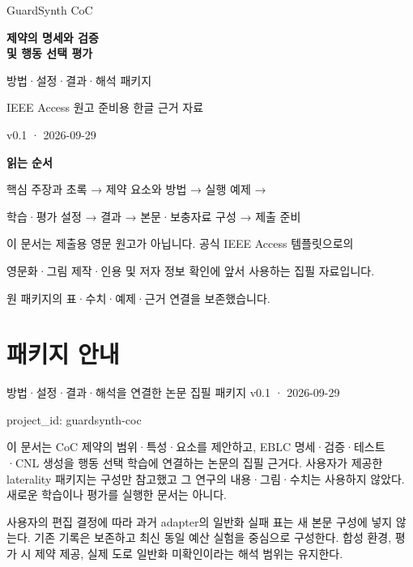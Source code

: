 \documentclass[11pt,a4paper]{article}
\begin{document}
\begin{titlepage}
\vspace*{20mm}
{\color{navy}\Large GuardSynth CoC\par}
\vspace{10mm}
{\huge\bfseries 제약의 명세와 검증\\[4mm]및 행동 선택 평가\par}
\vspace{12mm}
{\Large 방법·설정·결과·해석 패키지\par}
\vspace{6mm}
IEEE Access 원고 준비용 한글 근거 자료\par
v0.1 · 2026-09-29\par
\vspace{12mm}
\textbf{읽는 순서}\par
핵심 주장과 초록 → 제약 요소와 방법 → 실행 예제 →\par
학습·평가 설정 → 결과 → 본문·보충자료 구성 → 제출 준비\par
\vfill
이 문서는 제출용 영문 원고가 아닙니다. 공식 IEEE Access 템플릿으로의\par
영문화·그림 제작·인용 및 저자 정보 확인에 앞서 사용하는 집필 자료입니다.\par
원 패키지의 표·수치·예제·근거 연결을 보존했습니다.\par
\end{titlepage}
\tableofcontents
\clearpage
\section*{패키지 안내}


방법·설정·결과·해석을 연결한 논문 집필 패키지 v0.1 · 2026-09-29\par

project\_\allowbreak{}id: {\ttfamily\small guardsynth-coc}\par

이 문서는 CoC 제약의 범위·특성·요소를 제안하고, EBLC 명세·검증·테스트·CNL 생성을 행동 선택 학습에 연결하는 논문의 집필 근거다. 사용자가 제공한 laterality 패키지는 구성만 참고했고 그 연구의 내용·그림·수치는 사용하지 않았다. 새로운 학습이나 평가를 실행한 문서는 아니다.\par

사용자의 편집 결정에 따라 과거 adapter의 일반화 실패 표는 새 본문 구성에 넣지 않는다. 기존 기록은 보존하고 최신 동일 예산 실험을 중심으로 구성한다. 합성 환경, 평가 시 제약 제공, 실제 도로 일반화 미확인이라는 해석 범위는 유지한다.\par
\end{document}
